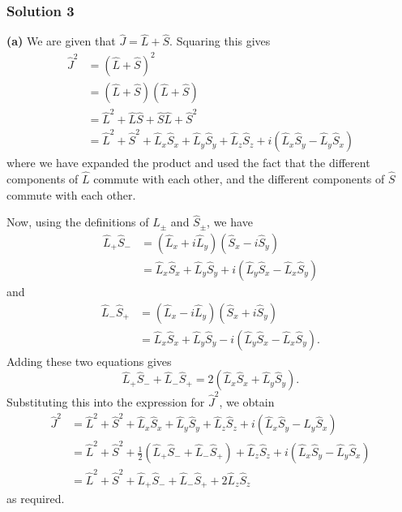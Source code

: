 \documentclass{article}
\begin{document}
\subsubsection{Solution 3}
\textbf{(a)} 
We are given that $\hat{J} = \hat{L} + \hat{S}$.  Squaring this gives
\begin{align*}
\hat{J}^2 &= (\hat{L} + \hat{S})^2 \\
&= (\hat{L} + \hat{S})(\hat{L} + \hat{S}) \\
&= \hat{L}^2 + \hat{L}\hat{S} + \hat{S}\hat{L} + \hat{S}^2 \\
&= \hat{L}^2 + \hat{S}^2 + \hat{L}_x \hat{S}_x + \hat{L}_y \hat{S}_y + \hat{L}_z \hat{S}_z + i(\hat{L}_x \hat{S}_y - \hat{L}_y \hat{S}_x)
\end{align*}
where we have expanded the product and used the fact that the different components of $\hat{L}$ commute with each other, and the different components of $\hat{S}$ commute with each other.

Now, using the definitions of $\hat{L}_\pm$ and $\hat{S}_\pm$, we have
\begin{align*}
\hat{L}_+ \hat{S}_- &= (\hat{L}_x + i \hat{L}_y)(\hat{S}_x - i \hat{S}_y) \\
&= \hat{L}_x \hat{S}_x + \hat{L}_y \hat{S}_y + i(\hat{L}_y \hat{S}_x - \hat{L}_x \hat{S}_y)
\end{align*}
and
\begin{align*}
\hat{L}_- \hat{S}_+ &= (\hat{L}_x - i \hat{L}_y)(\hat{S}_x + i \hat{S}_y) \\
&= \hat{L}_x \hat{S}_x + \hat{L}_y \hat{S}_y - i(\hat{L}_y \hat{S}_x - \hat{L}_x \hat{S}_y).
\end{align*}
Adding these two equations gives
\[
\hat{L}_+ \hat{S}_- + \hat{L}_- \hat{S}_+ = 2 (\hat{L}_x \hat{S}_x + \hat{L}_y \hat{S}_y).
\]
Substituting this into the expression for $\hat{J}^2$, we obtain
\begin{align*}
\hat{J}^2 &= \hat{L}^2 + \hat{S}^2 + \hat{L}_x \hat{S}_x + \hat{L}_y \hat{S}_y + \hat{L}_z \hat{S}_z + i(\hat{L}_x \hat{S}_y - \hat{L}_y \hat{S}_x) \\
&= \hat{L}^2 + \hat{S}^2 + \frac{1}{2}(\hat{L}_+ \hat{S}_- + \hat{L}_- \hat{S}_+) + \hat{L}_z \hat{S}_z + i(\hat{L}_x \hat{S}_y - \hat{L}_y \hat{S}_x) \\
&= \hat{L}^2 + \hat{S}^2 + \hat{L}_+ \hat{S}_- + \hat{L}_- \hat{S}_+ + 2 \hat{L}_z \hat{S}_z
\end{align*}
as required.
\end{document}
